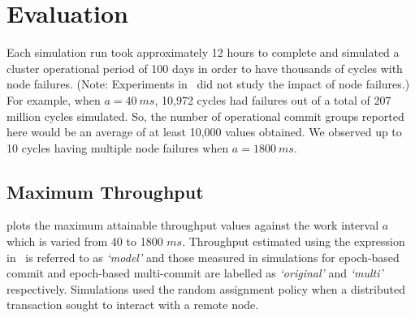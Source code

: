 \section{Evaluation}
\label{sec:evaluation}




Each simulation run took approximately 12 hours to complete and simulated a cluster operational period of 100 
days in order to have thousands of cycles with node failures. (Note: Experiments in~\cite{lu} did not study the impact of node failures.) For example, when $a=40~ms$, 10,972 cycles had 
failures out of a total of 207 million cycles simulated. So, the number of operational commit groups reported 
here would be an average of at least 10,000 values obtained. 
We observed up to 10 cycles having multiple node failures when $a=1800~ms$.

\subsection{Maximum Throughput}
\label{sec:determ-optim-ep}

 plots the maximum attainable throughput values against the work interval $a$ which is varied 
from 40 to 1800 $ms$. Throughput estimated using the expression in~ is referred 
to as \emph{`model'} and those measured in simulations for epoch-based commit and epoch-based multi-commit 
are labelled as \emph{`original'} and \emph{`multi'} respectively. Simulations used the random assignment 
policy when a distributed transaction sought to interact with a remote node.


